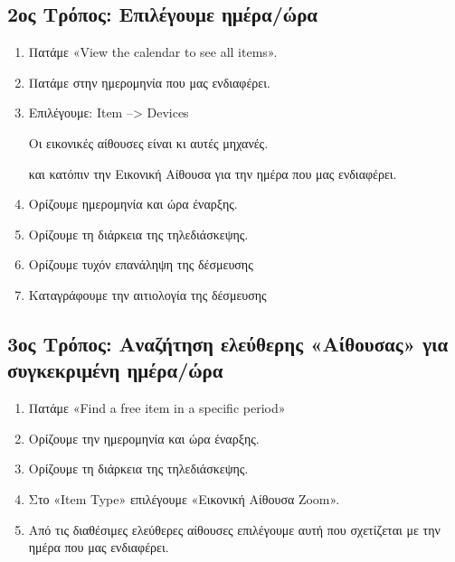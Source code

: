 \documentclass[letterpaper,10pt,greek]{sphinxhowto}
\begin{document}
\subsection{2ος Τρόπος: Επιλέγουμε ημέρα/ώρα}
\label{\detokenize{HowToZoom:id2}}\begin{enumerate}
%
\item {} 
\sphinxAtStartPar
Πατάμε «View the calendar to see all items».

\item {} 
\sphinxAtStartPar
Πατάμε στην ημερομηνία που μας ενδιαφέρει.

\item {} 
\sphinxAtStartPar
Επιλέγουμε: Item –> Devices %
\begin{footnote}[1]\sphinxAtStartFootnote
Οι εικονικές αίθουσες είναι κι αυτές μηχανές.
%
\end{footnote}  και κατόπιν την Εικονική Αίθουσα για την ημέρα που μας ενδιαφέρει.

\item {} 
\sphinxAtStartPar
Ορίζουμε ημερομηνία και ώρα έναρξης.

\item {} 
\sphinxAtStartPar
Ορίζουμε τη διάρκεια της τηλεδιάσκεψης.

\item {} 
\sphinxAtStartPar
Ορίζουμε τυχόν επανάληψη της δέσμευσης

\item {} 
\sphinxAtStartPar
Καταγράφουμε την αιτιολογία της δέσμευσης

\end{enumerate}


\subsection{3ος Τρόπος: Αναζήτηση ελεύθερης «Αίθουσας» για συγκεκριμένη ημέρα/ώρα}
\label{\detokenize{HowToZoom:id4}}\begin{enumerate}
%
\item {} 
\sphinxAtStartPar
Πατάμε «Find a free item in a specific period»

\item {} 
\sphinxAtStartPar
Ορίζουμε την ημερομηνία και ώρα έναρξης.

\item {} 
\sphinxAtStartPar
Ορίζουμε τη διάρκεια της τηλεδιάσκεψης.

\item {} 
\sphinxAtStartPar
Στο «Item Type» επιλέγουμε «Εικονική Αίθουσα Zoom».

\item {} 
\sphinxAtStartPar
Από τις διαθέσιμες ελεύθερες αίθουσες επιλέγουμε αυτή που σχετίζεται με την ημέρα που μας ενδιαφέρει.

\end{enumerate}



\renewcommand{\indexname}{Ευρετήριο}
\printindex
\end{document}

